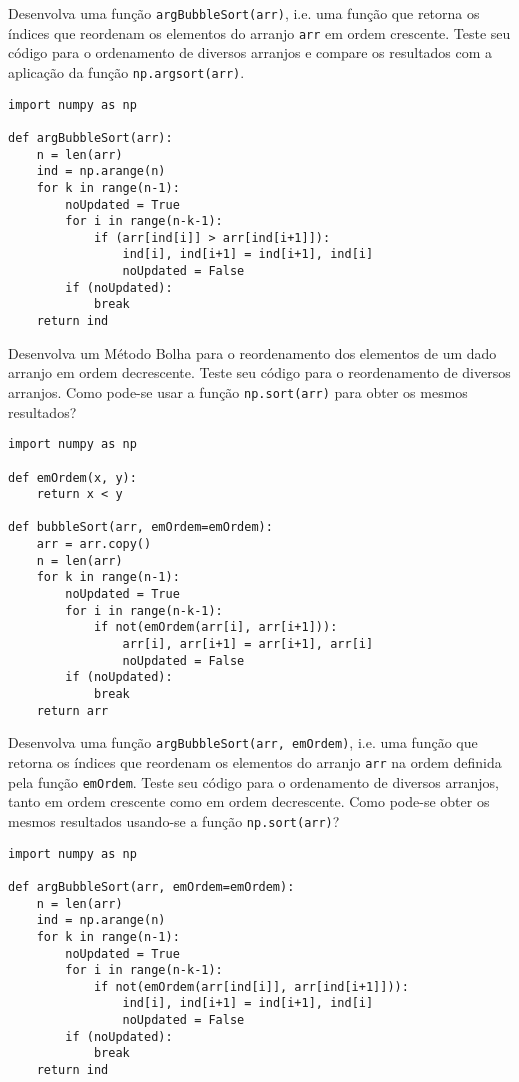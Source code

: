 \begin{exer}
  Desenvolva uma função \lstinline+argBubbleSort(arr)+, i.e. uma função que retorna os índices que reordenam os elementos do arranjo \lstinline+arr+ em ordem crescente. Teste seu código para o ordenamento de diversos arranjos e compare os resultados com a aplicação da função \lstinline+np.argsort(arr)+.
\end{exer}
\begin{resp}
\begin{lstlisting}
import numpy as np

def argBubbleSort(arr):
    n = len(arr)
    ind = np.arange(n)
    for k in range(n-1):
        noUpdated = True
        for i in range(n-k-1):
            if (arr[ind[i]] > arr[ind[i+1]]):
                ind[i], ind[i+1] = ind[i+1], ind[i]
                noUpdated = False
        if (noUpdated):
            break
    return ind
\end{lstlisting}
\end{resp}

\begin{exer}
  Desenvolva um Método Bolha para o reordenamento dos elementos de um dado arranjo em ordem decrescente. Teste seu código para o reordenamento de diversos arranjos. Como pode-se usar a função \lstinline+np.sort(arr)+ para obter os mesmos resultados?
\end{exer}
\begin{resp}
\begin{lstlisting}
import numpy as np

def emOrdem(x, y):
    return x < y

def bubbleSort(arr, emOrdem=emOrdem):
    arr = arr.copy()
    n = len(arr)
    for k in range(n-1):
        noUpdated = True
        for i in range(n-k-1):
            if not(emOrdem(arr[i], arr[i+1])):
                arr[i], arr[i+1] = arr[i+1], arr[i]
                noUpdated = False
        if (noUpdated):
            break
    return arr
\end{lstlisting}
\end{resp}

\begin{exer}
  Desenvolva uma função \lstinline+argBubbleSort(arr, emOrdem)+, i.e. uma função que retorna os índices que reordenam os elementos do arranjo \lstinline+arr+ na ordem definida pela função \lstinline+emOrdem+. Teste seu código para o ordenamento de diversos arranjos, tanto em ordem crescente como em ordem decrescente. Como pode-se obter os mesmos resultados usando-se a função \lstinline+np.sort(arr)+?
\end{exer}
\begin{resp}
\begin{lstlisting}
import numpy as np

def argBubbleSort(arr, emOrdem=emOrdem):
    n = len(arr)
    ind = np.arange(n)
    for k in range(n-1):
        noUpdated = True
        for i in range(n-k-1):
            if not(emOrdem(arr[ind[i]], arr[ind[i+1]])):
                ind[i], ind[i+1] = ind[i+1], ind[i]
                noUpdated = False
        if (noUpdated):
            break
    return ind
\end{lstlisting}
\end{resp}

